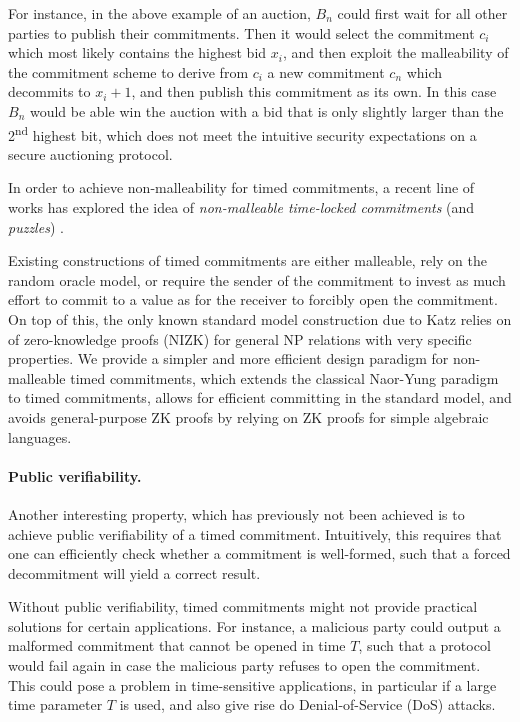 For instance, in the above example of an auction, $B_n$ could first wait for all other parties to publish their commitments. Then it would select the commitment $c_i$ which most likely contains the highest bid $x_i$, and then exploit the malleability of the commitment scheme to derive from $c_i$ a new commitment $c_n$ which decommits to $x_i + 1$, and then publish this commitment as its own. In this case $B_n$ would be able win the auction with a bid that is only slightly larger than the 2\textsuperscript{nd} highest bit, which does not meet the intuitive security expectations on a secure auctioning protocol.

In order to achieve non-malleability for timed commitments, a recent line of works has explored the idea of \emph{non-malleable time-locked commitments} (and \emph{puzzles})  \cite{TCC:KatLosXu20,EPRINT:EFKP20a,EC:BDDNO21}.


Existing constructions of timed commitments are either malleable, rely on the random oracle model, or require the sender of the commitment to invest as much effort to commit to a value as for the receiver to forcibly open the commitment.  On top of this, the only known standard model construction due to Katz \etal \cite{TCC:KatLosXu20} relies on of zero-knowledge proofs (NIZK) for general NP relations with very specific properties. 
We provide a simpler and more efficient design paradigm for non-malleable timed commitments, which extends the classical Naor-Yung paradigm \cite{STOC:NaoYun90} to timed commitments, allows for efficient committing in the standard model, and avoids general-purpose ZK proofs by relying on ZK proofs for simple algebraic languages.

\paragraph{Public verifiability.}
Another interesting property, which has previously not been achieved  is to achieve public verifiability of a timed commitment. Intuitively, this requires that one can efficiently check whether a commitment is well-formed, such that a forced decommitment will yield a correct result.

Without public verifiability, timed commitments might not provide practical solutions for certain applications. For instance, a malicious party could output a malformed commitment that cannot be opened in time $T$, such that a protocol would fail again in case the malicious party refuses to open the commitment. This could pose a problem in time-sensitive applications, in particular if a large time parameter $T$ is used, and also give rise do Denial-of-Service (DoS) attacks.



